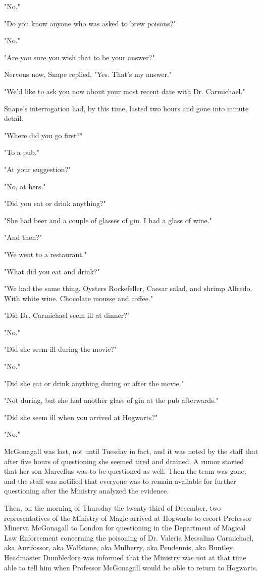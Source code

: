 "No."

"Do you know anyone who was asked to brew poisons?"

"No."

"Are you sure you wish that to be your answer?"

Nervous now, Snape replied, "Yes. That's my answer."

"We'd like to ask you now about your most recent date with Dr. Carmichael."

Snape's interrogation had, by this time, lasted two hours and gone into minute detail.

"Where did you go first?"

"To a pub."

"At your suggestion?"

"No, at hers."

"Did you eat or drink anything?"

"She had beer and a couple of glasses of gin. I had a glass of wine."

"And then?"

"We went to a restaurant."

"What did you eat and drink?"

"We had the same thing. Oysters Rockefeller, Caesar salad, and shrimp Alfredo. With white wine. Chocolate mousse and coffee."

"Did Dr. Carmichael seem ill at dinner?"

"No."

"Did she seem ill during the movie?"

"No."

"Did she eat or drink anything during or after the movie."

"Not during, but she had another glass of gin at the pub afterwards."

"Did she seem ill when you arrived at Hogwarts?"

"No."

McGonagall was last, not until Tuesday in fact, and it was noted by the staff that after five hours of questioning she seemed tired and drained. A rumor started that her son Marcellus was to be questioned as well. Then the team was gone, and the staff was notified that everyone was to remain available for further questioning after the Ministry analyzed the evidence.

Then, on the morning of Thursday the twenty-third of December, two representatives of the Ministry of Magic arrived at Hogwarts to escort Professor Minerva McGonagall to London for questioning in the Department of Magical Law Enforcement concerning the poisoning of Dr. Valeria Messalina Carmichael, aka Aurifossor, aka Wolfstone, aka Mulberry, aka Pendennis, aka Buntley. Headmaster Dumbledore was informed that the Ministry was not at that time able to tell him when Professor McGonagall would be able to return to Hogwarts.

